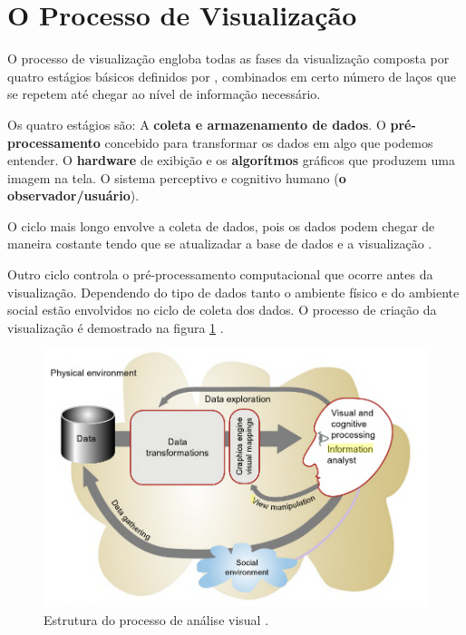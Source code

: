 
\section{O Processo de Visualização}
\label{Processo-de-visualizacao-sec}

O processo de visualização engloba todas as fases da visualização composta por quatro estágios básicos definidos por \cite{ware2012information}, combinados em certo número de laços que se repetem até chegar ao nível de informação necessário.

Os quatro estágios são: A \textbf{coleta e armazenamento de dados}.  
O \textbf{pré-processamento} concebido para transformar os dados em algo que podemos entender. O \textbf{hardware} de exibição e os \textbf{algorítmos} gráficos que produzem uma imagem na tela.
O sistema perceptivo e cognitivo humano (\textbf{o observador/usuário}).

O ciclo mais longo envolve a coleta de dados, pois os dados podem chegar de maneira costante tendo que se atualizadar a base de dados e a visualização \cite{ware2012information}. 

Outro ciclo controla o pré-processamento computacional que ocorre antes da visualização.
Dependendo do tipo de dados tanto o ambiente físico e do ambiente social estão envolvidos no ciclo de coleta dos dados. O processo de criação da visualização é demostrado na figura \ref{fig:processovisual} \cite{ware2012information}.

\begin{figure}[htb]
		\begin{center}
			\includegraphics[width=13cm]{images/LevelVisualization.png}
            \caption {Estrutura do processo de análise visual \cite{ware2012information}.}          
            
	\label{fig:processovisual}
		\end{center}
	\end{figure}

